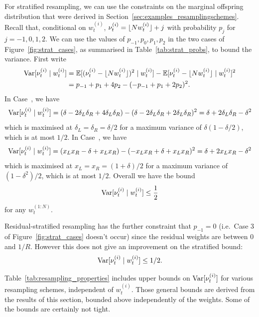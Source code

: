 For stratified resampling, we can use the constraints on the marginal offspring distribution that were derived in Section~\ref{sec:examples_resamplingschemes}. Recall that, conditional on $w_t^{(i)}$, $\nu_t^{(i)} = \lfloor N w_t^{(i)} \rfloor + j$ with probability $p_{j}$ for $j=-1,0,1,2$.
We can use the values of $p_{-1},p_0,p_1,p_2$ in the two cases of Figure~\ref{fig:strat_cases}, as summarised in Table~\ref{tab:strat_probs}, to bound the variance. First write
\begin{align*}
\operatorname{Var}[ \nu_t^{(i)} \mid w_t^{(i)} ]
&= \mathbb{E}[ (\nu_t^{(i)} - \lfloor N w_t^{(i)} \rfloor)^2 \mid w_t^{(i)} ] 
        - \mathbb{E}[ \nu_t^{(i)} -\lfloor N w_t^{(i)} \rfloor \mid w_t^{(i)} ]^2 \\
&= p_{-1} + p_1 + 4p_2 - (-p_{-1} + p_1 + 2p_2)^2 .
\end{align*}
In Case~, we have
\begin{equation*}
\operatorname{Var}[ \nu_t^{(i)} \mid w_t^{(i)} ]
= (\delta -2\delta_L\delta_R + 4\delta_L\delta_R) 
        - (\delta - 2\delta_L\delta_R + 2\delta_L\delta_R)^2
= \delta +2\delta_L\delta_R - \delta^2
\end{equation*}
which is maximised at $\delta_L=\delta_R=\delta/2$ for a maximum variance of $\delta(1-\delta/2)$, which is at most $1/2$.
In Case~, we have
\begin{equation*}
\operatorname{Var}[ \nu_t^{(i)} \mid w_t^{(i)} ]
= (x_Lx_R -\delta + x_Lx_R) - (-x_Lx_R + \delta + x_Lx_R)^2
= \delta + 2x_Lx_R -\delta^2
\end{equation*}
which is maximised at $x_L=x_R=(1+\delta)/2$ for a maximum variance of $(1-\delta^2)/2$, which is at most $1/2$.
Overall we have the bound
\begin{equation*}
\operatorname{Var}[ \nu_t^{(i)} \mid w_t^{(i)} ]
\leq \frac{1}{2}
\end{equation*}
for any $w_t^{(1:N)}$.

Residual-stratified resampling has the further constraint that $p_{-1} =0$ (i.e.\ Case 3 of Figure~\ref{fig:strat_cases} doesn't occur) since the residual weights are between $0$ and $1/R$. However this does not give an improvement on the stratified bound:
\begin{equation*}
\operatorname{Var}[ \nu_t^{(i)} \mid w_t^{(i)} ] \leq 1/2 .
\end{equation*}

Table~\ref{tab:resampling_properties} includes upper bounds on $\operatorname{Var}[\nu_t^{(i)}]$ for various resampling schemes, independent of $w_t^{(i)}$. Those general bounds are derived from the results of this section, bounded above independently of the weights. Some of the bounds are certainly not tight.




